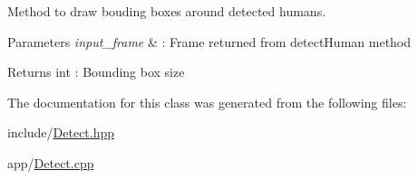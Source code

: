 Method to draw bouding boxes around detected humans. 


\begin{DoxyParams}{Parameters}
{\em input\+\_\+frame} & \+: Frame returned from detect\+Human method \\
\hline
\end{DoxyParams}
\begin{DoxyReturn}{Returns}
int \+: Bounding box size 
\end{DoxyReturn}


The documentation for this class was generated from the following files\+:\begin{DoxyCompactItemize}
\item 
include/\hyperlink{Detect_8hpp}{Detect.\+hpp}\item 
app/\hyperlink{Detect_8cpp}{Detect.\+cpp}\end{DoxyCompactItemize}
